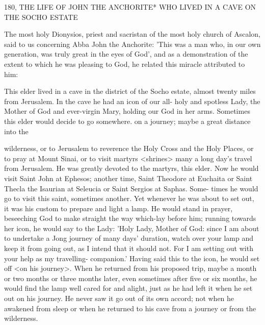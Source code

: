 180, THE LIFE OF JOHN THE ANCHORITE*
WHO LIVED IN A CAVE ON THE SOCHO ESTATE

The most holy Dionysios, priest and sacristan of the most holy
church of Ascalon, said to us concerning Abba John the Anchorite:
'This was a man who, in our own generation, was truly great in the
eyes of God', and as a demonstration of the extent to which he was
pleasing to God, he related this miracle attributed to him:

This elder lived in a cave in the district of the Socho estate, almost
twenty miles from Jerusalem.
In the cave he had an icon of our all-
holy and spotless Lady, the Mother of God and ever-virgin Mary,
holding our God in her arms.
Sometimes this elder would decide to
go somewhere.
on a journey; maybe a great distance into the

wilderness, or to Jerusalem to reverence the Holy Cross and the
Holy Places, or to pray at Mount Sinai, or to visit martyrs
<shrines> many a long day's travel from Jerusalem.
He was greatly
devoted to the martyrs, this elder.
Now he would visit Saint John
at Ephesos; another time, Saint Theodore at Euchaita or Saint
Thecla the Isaurian at Seleucia or Saint Sergios at Saphas.
Some-
times he would go to visit this saint, sometimes another.
Yet
whenever he was about to set out, it was his custom to prepare and
light a lamp.
He would stand in prayer, beseeching God to make
straight the way which-lay before him; running towards her icon, he
would say to the Lady: 'Holy Lady, Mother of God: since I am
about to undertake a Jong journey of many days' duration, watch
over your lamp and keep it from going out, as I intend that it
should not.
For I am setting out with your help as my travelling-
companion.' Having said this to the icon, he would set off <on his
journey>.
When he returned from his proposed trip, maybe a month
or two months or three months later, even sometimes after five or
six months, he would find the lamp well cared for and alight, just
as he had left it when he set out on his journey.
He never saw it go
out of its own accord; not when he awakened from sleep or when
he returned to his cave from a journey or from the wilderness.

